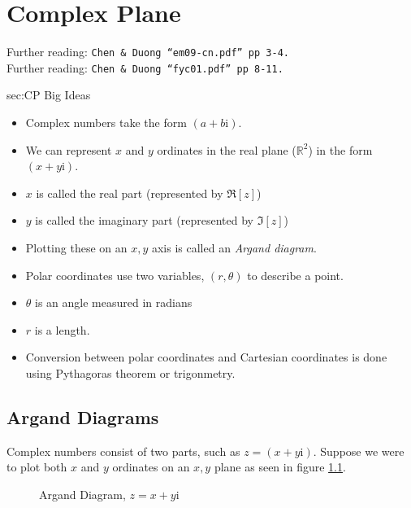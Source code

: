 \chapter{Complex Plane}
\label{chap:CP}
Further reading: \texttt{Chen \& Duong ``em09-cn.pdf'' pp 3-4.} \\
Further reading: \texttt{Chen \& Duong ``fyc01.pdf'' pp 8-11.}

\begin{bigideas}{sec:CP Big Ideas}
\begin{itemize}
  \item Complex numbers take the form $(a + b\text{i})$.
  \item We can represent $x$ and $y$ ordinates in the real plane ($\mathbb{R}^2$)
  in the form $(x + y\text{i})$.
  \item $x$ is called the real part (represented by $\Re[z]$)
  \item $y$ is called the imaginary part (represented by $\Im[z]$)
  \item Plotting these on an $x,y$ axis is called an \emph{Argand diagram}.
  \item Polar coordinates use two variables, $(r,\theta)$ to describe a point.
  \item $\theta$ is an angle measured in radians
  \item $r$ is a length. 
  \item Conversion between polar coordinates and Cartesian coordinates is done
  using Pythagoras theorem or trigonmetry.
\end{itemize}
\end{bigideas}

\section{Argand Diagrams}
\label{sec:CP Argand Diagrams}
Complex numbers consist of two parts, such as $z = (x + y\text{i})$. Suppose we
were to plot both $x$ and $y$ ordinates on an $x,y$ plane as seen in figure
\ref{fig:argand}.
\begin{figure}[!htb]
\label{fig:argand}
\begin{center}
\end{center}
\caption{Argand Diagram, $z = x + y\text{i}$}
\end{figure}

